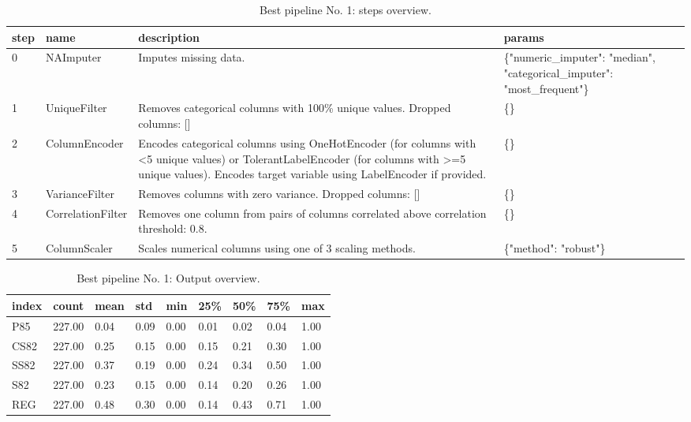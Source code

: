 \documentclass{article}%
\begin{document}
%


\begin{table}[H]%
\begin{center}%
\renewcommand{\arraystretch}{1.5}%
\begin{tabular}{p{7mm} p{35mm} p{80mm} p{50mm}}%
\hline%
\textbf{step}&\textbf{name}&\textbf{description}&\textbf{params}\\%
\hline%
0&NAImputer&Imputes missing data.&\{"numeric\_imputer": "median", "categorical\_imputer": "most\_frequent"\}\\%
1&UniqueFilter&Removes categorical columns with 100\% unique values. Dropped columns: {[}{]}&\{\}\\%
2&ColumnEncoder&Encodes categorical columns using OneHotEncoder (for columns with <5 unique values) or TolerantLabelEncoder (for columns with >=5 unique values). Encodes target variable using LabelEncoder if provided.&\{\}\\%
3&VarianceFilter&Removes columns with zero variance. Dropped columns: {[}{]}&\{\}\\%
4&CorrelationFilter&Removes one column from pairs of columns correlated above correlation threshold: 0.8.&\{\}\\%
5&ColumnScaler&Scales numerical columns using one of 3 scaling methods.&\{"method": "robust"\}\\%
\hline%
\end{tabular}%
\end{center}%
\caption{Best pipeline No. 1: steps overview.}%
\end{table}

%


\begin{table}[H]%
\begin{center}%
\renewcommand{\arraystretch}{1.5}%
\begin{tabular}{l l l l l l l l l}%
\hline%
\textbf{index}&\textbf{count}&\textbf{mean}&\textbf{std}&\textbf{min}&\textbf{25\%}&\textbf{50\%}&\textbf{75\%}&\textbf{max}\\%
\hline%
P85&227.00&0.04&0.09&0.00&0.01&0.02&0.04&1.00\\%
CS82&227.00&0.25&0.15&0.00&0.15&0.21&0.30&1.00\\%
SS82&227.00&0.37&0.19&0.00&0.24&0.34&0.50&1.00\\%
S82&227.00&0.23&0.15&0.00&0.14&0.20&0.26&1.00\\%
REG&227.00&0.48&0.30&0.00&0.14&0.43&0.71&1.00\\%
\hline%
\end{tabular}%
\end{center}%
\caption{Best pipeline No. 1: Output overview.}%
\end{table}
\end{document}
